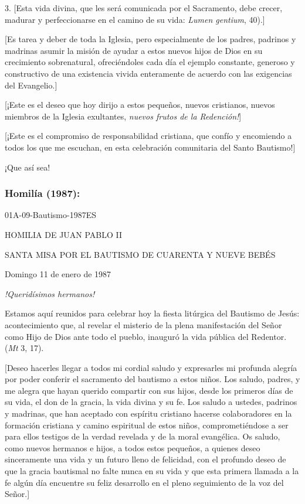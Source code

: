 \begin{body}
	3. {[}Esta vida divina, que les será comunicada por el Sacramento, debe crecer, madurar y perfeccionarse en el camino de su vida:  \emph{Lumen gentium}, 40).{]}
	
	{[}Es tarea y deber de toda la Iglesia, pero especialmente de los padres, padrinos y madrinas asumir la misión de ayudar a estos nuevos hijos de Dios en su crecimiento sobrenatural, ofreciéndoles cada día el ejemplo constante, generoso y constructivo de una existencia vivida enteramente de acuerdo con las exigencias del Evangelio.{]}
	
	{[}¡Este es el deseo que hoy dirijo a estos pequeños, nuevos cristianos, nuevos miembros de la Iglesia exultantes, \emph{nuevos frutos de la Redención!}{]}
	
	{[}¡Este es el compromiso de responsabilidad cristiana, que confío y encomiendo a todos los que me escuchan, en esta celebración comunitaria del Santo Bautismo!{]}
	
	¡Que así sea!
	
	\subsubsection{Homilía (1987): } 01A-09-Bautismo-1987ES
	
	HOMILIA DE JUAN PABLO II
	
	SANTA MISA POR EL BAUTISMO DE CUARENTA Y NUEVE BEBÉS
	
	Domingo 11 de enero de 1987
	
	\emph{!Queridísimos hermanos!}
	
	Estamos aquí reunidos para celebrar hoy la fiesta litúrgica del Bautismo de Jesús: acontecimiento que, al revelar el misterio de la plena manifestación del Señor como Hijo de Dios ante todo el pueblo, inauguró la vida pública del Redentor.  (\emph{Mt} 3, 17).
	
	{[}Deseo hacerles llegar a todos mi cordial saludo y expresarles mi profunda alegría por poder conferir el sacramento del bautismo a estos niños. Los saludo, padres, y me alegra que hayan querido compartir con sus hijos, desde los primeros días de su vida, el don de la gracia, la vida divina y su fe. Los saludo a ustedes, padrinos y madrinas, que han aceptado con espíritu cristiano hacerse colaboradores en la formación cristiana y camino espiritual de estos niños, comprometiéndose a ser para ellos testigos de la verdad revelada y de la moral evangélica. Os saludo, como nuevos hermanos e hijos, a todos estos pequeños, a quienes deseo sinceramente una vida y un futuro lleno de felicidad, con el profundo deseo de que la gracia bautismal no falte nunca en su vida y que esta primera llamada a la fe algún día encuentre su feliz desarrollo en el pleno seguimiento de la voz del Señor.{]}
	

\end{body}
